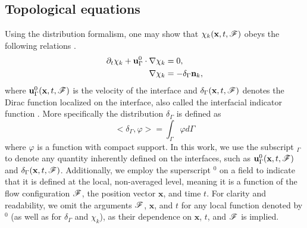 \subsection{Topological equations}
Using the distribution formalism, one may show that $\chi_k(\textbf{x},t,\mathscr{F})$ obeys the following relations \citep{drew1983mathematical}. 
\begin{align}
    \pddt \chi_k
    + \textbf{u}_\Gamma^0 \cdot \grad \chi_k
    &= 0,
    \label{eq:dt_chi_k}\\
    \label{eq:grad_chi_k}
    \grad \chi_k
    &= - \delta_\Gamma \textbf{n}_k, 
\end{align}
where $\textbf{u}^0_\Gamma(\textbf{x},t,\mathscr{F})$ is the velocity of the interface and $\delta_\Gamma(\textbf{x},t,\mathscr{F})$ denotes the Dirac function localized on the interface, also called the interfacial indicator function \citep{drew1983mathematical,junqua2003}. 
More specifically the distribution $\delta_\Gamma$ is defined as \citep{appel2007}
\begin{equation}
<\delta_\Gamma,\varphi> =\int_{\Gamma} \varphi d\Gamma 
\label{eq:def_surf_distribution}
\end{equation}  
where $\varphi$ is a function with compact support. %
In this work, we use the subscript $_\Gamma$ to denote any quantity inherently defined on the interfaces, such as $\textbf{u}_\Gamma^0(\textbf{x}, t, \mathscr{F})$ and $\delta_\Gamma(\textbf{x}, t, \mathscr{F})$. Additionally, we employ the superscript $^0$ on a field to indicate that it is defined at the local, non-averaged level, meaning it is a function of the flow configuration $\mathscr{F}$, the position vector $\textbf{x}$, and time $t$. For clarity and readability, we omit the arguments $\mathscr{F}$, $\textbf{x}$, and $t$ for any local function denoted by $^0$ (as well as for $\delta_\Gamma$ and $\chi_k$), as their dependence on $\textbf{x}$, $t$, and $\mathscr{F}$ is implied.

